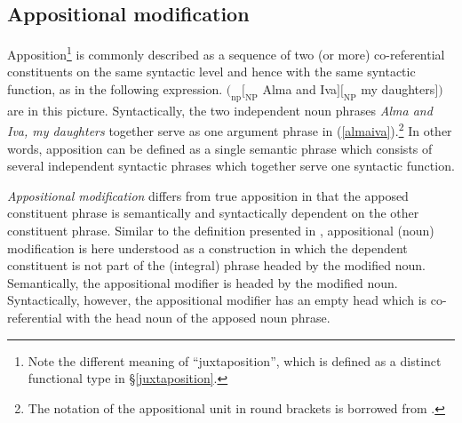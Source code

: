\subsection{Appositional modification} \label{apposition}
Apposition\footnote{Note the different meaning of “juxtaposition”, which is defined as a distinct functional type in \S\ref{juxtaposition}.} is commonly described as a sequence of two (or more) co-referential constituents on the same syntactic level and hence with the same syntactic function, as in the following expression.
\ea
$(_\textrm{np} [_\textrm{NP}$ Alma and Iva$] [_\textrm{NP}$ my daughters$] )$ are in this picture. \label{almaiva}
\z
Syntactically, the two independent noun phrases \textit{Alma and Iva, my daughters} together serve as one argument phrase in (\ref{almaiva}).\footnote{The notation of the appositional unit in round brackets is borrowed from \textcite[21]{rijkhoff2002}.} In other words, apposition can be defined as a single semantic phrase which consists of several independent syntactic phrases which together serve one syntactic function.

\emph{Appositional modification} differs from true apposition in that the apposed constituent phrase is semantically and syntactically dependent on the other constituent phrase. Similar to the definition presented in \textcite[22]{rijkhoff2002}, appositional (noun) modification is here understood as a construction in which the dependent constituent is not part of the (integral) phrase headed by the modified noun. Semantically, the appositional modifier is headed by the modified noun. Syntactically, however, the appositional modifier has an empty head which is co-referential with the head noun of the apposed noun phrase.


